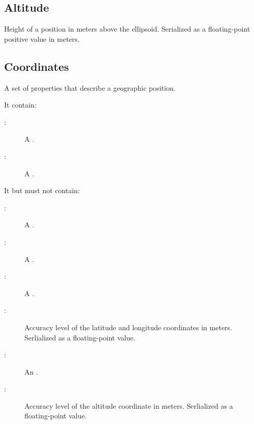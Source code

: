 \documentclass[letterpaper,10pt,english]{sphinxmanual}
\begin{document}
\subsection{Altitude}
\label{\detokenize{taxonomy_serialization:altitude}}\label{\detokenize{taxonomy_serialization:id6}}
Height of a position in meters above the ellipsoid.
Serialized as a floating-point positive value in meters.


\subsection{Coordinates}
\label{\detokenize{taxonomy_serialization:coordinates}}\label{\detokenize{taxonomy_serialization:coordinate}}
A set of properties that describe a geographic position.

It  contain:
\begin{description}
\item[{:}] \leavevmode
A {\hyperref[\detokenize{taxonomy_serialization:latitude}]{}}.

\item[{:}] \leavevmode
A {\hyperref[\detokenize{taxonomy_serialization:longitude}]{}}.

\end{description}

It  but must not contain:
\begin{description}
\item[{:}] \leavevmode
A {\hyperref[\detokenize{taxonomy_serialization:moment}]{}}.

\item[{:}] \leavevmode
A {\hyperref[\detokenize{taxonomy_serialization:heading}]{}}.

\item[{:}] \leavevmode
A {\hyperref[\detokenize{taxonomy_serialization:speed}]{}}.

\item[{:}] \leavevmode
Accuracy level of the latitude and longitude coordinates in meters.
Serlialized as a floating-point value.

\item[{:}] \leavevmode
An {\hyperref[\detokenize{taxonomy_serialization:altitude}]{}}.

\item[{:}] \leavevmode
Accuracy level of the altitude coordinate in meters.
Serlialized as a floating-point value.

\end{description}
\end{document}
